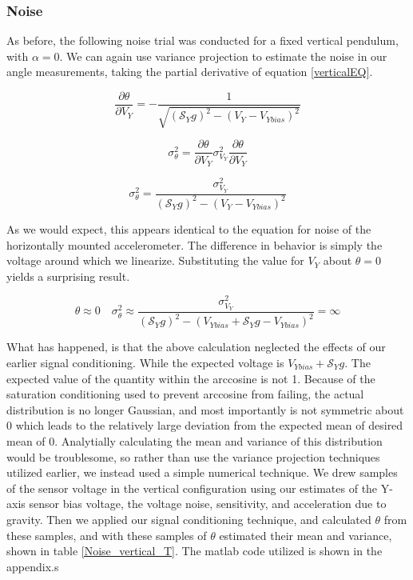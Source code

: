 \documentclass{article}
\theoremstyle{plain}
\theoremstyle{definition}
\theoremstyle{remark}
\newcommand{\Sens}{\mathcal{S}}
\begin{document}
\subsubsection{Noise}

As before, the following noise trial was conducted for a fixed vertical pendulum, with $\alpha = 0$. We can again use variance projection to estimate the noise in our angle measurements, taking the partial derivative of equation \ref{verticalEQ}.

$$ \frac{\partial \theta}{\partial V_{Y}} = -\frac{1}{\sqrt{(\Sens_{Y} g)^2 - (V_{Y} - V_{Ybias})^2}}$$

$$ \sigma^2_{\theta} = \frac{\partial \theta}{\partial V_{Y}} \sigma^2_{V_{Y}} \frac{\partial \theta}{\partial V_{Y}} $$

$$ \sigma^2_{\theta} = \frac{\sigma^2_{V_{Y}}}{(\Sens_{Y} g)^2 - (V_{Y} - V_{Ybias})^2}$$

As we would expect, this appears identical to the equation for noise of the horizontally mounted accelerometer.  The difference in behavior is simply the voltage around which we linearize.  Substituting the value for $V_{Y}$ about $\theta = 0$  yields a surprising result.


$$ \theta \approx 0 \quad \sigma^2_{\theta} \approx \frac{\sigma^2_{V_{Y}}}{(\Sens_{Y} g)^2 - (V_{Ybias} + \Sens_{Y} g - V_{Ybias})^2} = \infty$$

What has happened, is that the above calculation neglected the effects of our earlier signal conditioning.  While the expected voltage is $V_{Ybias} + \Sens_Y g$.  The expected value of the quantity within the arccosine is not 1.  Because of the saturation conditioning used to prevent arccosine from failing, the actual distribution is no longer Gaussian, and most importantly is not symmetric about 0 which leads to the relatively large deviation from the expected mean of desired mean of 0.  Analytially calculating the mean and variance of this distribution would be troublesome, so rather than use the variance projection techniques utilized earlier, we instead used a simple numerical technique.  We drew samples of the sensor voltage in the vertical configuration using our estimates of the Y-axis sensor bias voltage, the voltage noise, sensitivity, and acceleration due to gravity.  Then we applied our signal conditioning technique, and calculated $\theta$ from these samples, and with these samples of $\theta$ estimated their mean and variance, shown in table \ref{Noise_vertical_T}.  The matlab code utilized is shown in the appendix.s\\
\end{document}
